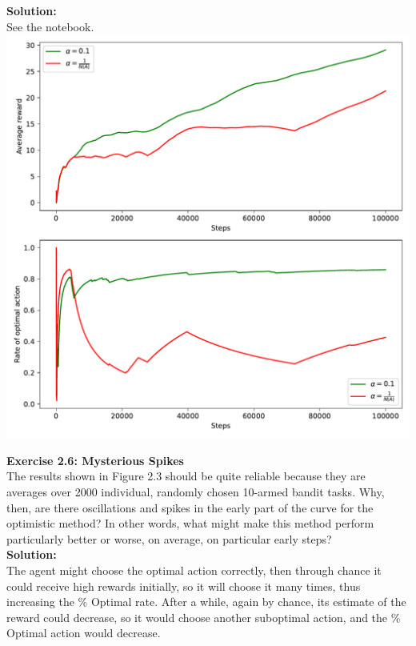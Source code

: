 \textbf{Solution:}\\
See the notebook. \\
\includegraphics[width=\textwidth, angle=0]{chapters_latex/figures/ex_02_05.pdf}


\textbf{Exercise 2.6: Mysterious Spikes} \\
The results shown in Figure 2.3 should be quite reliable
because they are averages over 2000 individual, randomly chosen 10-armed bandit tasks.
Why, then, are there oscillations and spikes in the early part of the curve for the optimistic
method? In other words, what might make this method perform particularly better or
worse, on average, on particular early steps?\\

\textbf{Solution:}\\
The agent might choose the optimal action correctly, then through chance it could receive high rewards initially, so it will choose it many times, thus increasing the \% Optimal rate. After a while, again by chance, its estimate of the reward could decrease, so it would choose another suboptimal action, and the \% Optimal action would decrease. \\


